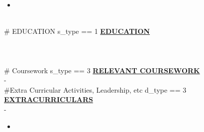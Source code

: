 \documentclass{article}
\begin{document}
\begin{itemize}[noitemsep,nolistsep,leftmargin=*]
    \item \textbf{} 
\end{itemize}
        ~\\
\#{ EDUCATION s_type == 1 }
\noindent \textbf{\underline{EDUCATION}} \\
\textbf{} \\
 \hfill {} \\
\textit{}\\
\#{ Coursework s_type == 3 }
\noindent \textbf{\underline{RELEVANT COURSEWORK}}\\
\textbf{} - \\
\#{Extra Curricular Activities, Leadership, etc d_type == 3}
\noindent \textbf{\underline{EXTRACURRICULARS}} \\
\noindent \textbf{} \hfill {} -  %
\begin{itemize}[noitemsep,nolistsep,leftmargin=*]
    \item \textbf{} 
\end{itemize}
        ~\\
\end{document}
